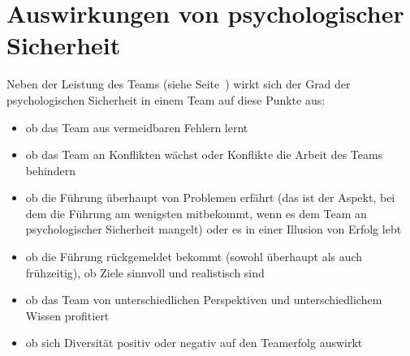 \section{Auswirkungen von psychologischer Sicherheit}
\label{ps-auswirkungen}


Neben der Leistung des Teams (siehe Seite~\pageref{ps-leistung}) wirkt sich der Grad der psychologischen Sicherheit in einem Team auf diese Punkte aus:

\begin{itemize}
    \item ob das Team aus vermeidbaren Fehlern lernt 
    \item ob das Team an Konflikten wächst oder Konflikte die Arbeit des Teams behindern 
    \item ob die Führung überhaupt von Problemen erfährt (das ist der Aspekt, bei dem die Führung am wenigsten mitbekommt, wenn es dem Team an psychologischer Sicherheit mangelt)  oder es in einer Illusion von Erfolg lebt
    \item ob die Führung rückgemeldet bekommt (sowohl überhaupt als auch frühzeitig), ob Ziele sinnvoll und realistisch sind 
    \item ob das Team von unterschiedlichen Perspektiven und unterschiedlichem Wissen profitiert
    \item ob sich Diversität positiv oder negativ auf den Teamerfolg auswirkt 
\end{itemize}

